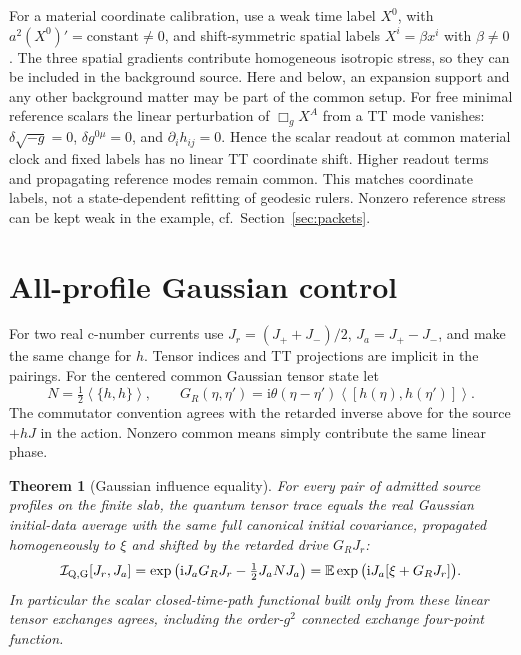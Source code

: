 \documentclass[11pt]{article}
\newtheorem{theorem}{Theorem}
\newcommand{\ii}{\mathrm{i}}
\newcommand{\av}[1]{\left\langle #1\right\rangle}
\newcommand{\I}{\mathcal I}
\begin{document}
For a material coordinate calibration, use a weak time label \(X^0\), with \(a^2(X^0)'=\text{constant}\ne0\), and shift-symmetric spatial labels \(X^i=\beta x^i\) with \(\beta\ne0\). The three spatial gradients contribute homogeneous isotropic stress, so they can be included in the background source. Here and below, an expansion support and any other background matter may be part of the common setup. For free minimal reference scalars the linear perturbation of \(\Box_g X^A\) from a TT mode vanishes: \(\delta \sqrt{-g}=0\), \(\delta g^{0\mu}=0\), and \(\partial_i h_{ij}=0\). Hence the scalar readout at common material clock and fixed labels has no linear TT coordinate shift. Higher readout terms and propagating reference modes remain common. This matches coordinate labels, not a state-dependent refitting of geodesic rulers. Nonzero reference stress can be kept weak in the example, cf.\ Section~\ref{sec:packets}.

\section{All-profile Gaussian control}
For two real c-number currents use \(J_r=(J_++J_-)/2\), \(J_a=J_+-J_-\), and make the same change for \(h\). Tensor indices and TT projections are implicit in the pairings. For the centered common Gaussian tensor state let
\[
 N=\tfrac12\av{\{h,h\}},\qquad
 G_R(\eta,\eta')=\ii\theta(\eta-\eta')\av{[h(\eta),h(\eta')]} .
\]
The commutator convention agrees with the retarded inverse above for the source \(+hJ\) in the action. Nonzero common means simply contribute the same linear phase.

\begin{theorem}[Gaussian influence equality]\label{thm:gaussian}
For every pair of admitted source profiles on the finite slab, the quantum tensor trace equals the real Gaussian initial-data average with the same full canonical initial covariance, propagated homogeneously to \(\xi\) and shifted by the retarded drive \(G_R J_r\):
\begin{equation}
 \I_{\rm Q,G}[J_r,J_a]
 =\exp\big(\ii J_aG_RJ_r-\tfrac12 J_aNJ_a\big)
 =\mathbb E\exp\big(\ii J_a[\xi+G_RJ_r]\big).
 \label{eq:gauss}
\end{equation}
In particular the scalar closed-time-path functional built only from these linear tensor exchanges agrees, including the order-\(g^2\) connected exchange four-point function.
\end{theorem}
\end{document}
